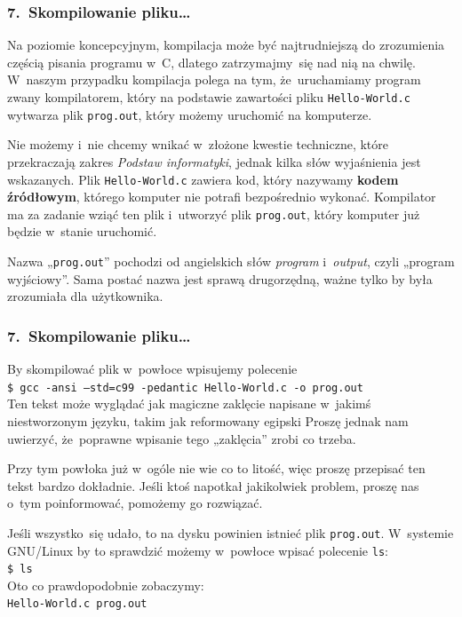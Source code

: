 \documentclass[10pt,t]{beamer}
\begin{document}
\begin{frame}
  \frametitle{7.~Skompilowanie pliku\ldots}


  Na poziomie koncepcyjnym, kompilacja może być najtrudniejszą do
  zrozumienia częścią pisania programu w~C, dlatego zatrzymajmy~się nad
  nią na chwilę. W~naszym przypadku kompilacja polega na tym, że~uruchamiamy
  program zwany kompilatorem, który na podstawie zawartości pliku
  \texttt{Hello-World.c} wytwarza plik \texttt{prog.out}, który możemy
  uruchomić na komputerze.

  Nie możemy i~nie chcemy wnikać w~złożone kwestie techniczne, które
  przekraczają zakres \textit{Podstaw informatyki}, jednak kilka słów
  wyjaśnienia jest wskazanych. Plik \texttt{Hello-World.c} zawiera kod,
  który nazywamy \textbf{kodem źródłowym}, którego komputer nie potrafi
  bezpośrednio wykonać. Kompilator ma za zadanie wziąć ten plik i~utworzyć
  plik \texttt{prog.out}, który komputer już będzie w~stanie uruchomić.

  Nazwa „\texttt{prog.out}” pochodzi od angielskich słów \textit{program}
  i~\textit{output}, czyli „program wyjściowy”. Sama postać nazwa jest
  sprawą drugorzędną, ważne tylko by była zrozumiała dla użytkownika.

\end{frame}




\begin{frame}
  \frametitle{7.~Skompilowanie pliku\ldots}


  By skompilować plik w~powłoce wpisujemy polecenie \\
  \texttt{\$ gcc -ansi --std=c99 -pedantic Hello-World.c -o
    prog.out} \\
  Ten tekst może wyglądać jak magiczne zaklęcie napisane w~jakimś
  niestworzonym języku, takim jak reformowany egipski
   Proszę jednak nam uwierzyć, że~poprawne wpisanie tego
  „zaklęcia” zrobi co trzeba.

  Przy tym powłoka już w~ogóle nie wie co to litość, więc proszę przepisać
  ten tekst bardzo dokładnie. Jeśli ktoś napotkał jakikolwiek problem,
  proszę nas o~tym poinformować, pomożemy go rozwiązać.

  Jeśli wszystko~się udało, to na dysku powinien istnieć plik
  \texttt{prog.out}. W~systemie GNU/Linux by to sprawdzić możemy w~powłoce
  wpisać polecenie \texttt{ls}: \\
  \texttt{\$ ls} \\
  Oto co prawdopodobnie zobaczymy: \\
  \texttt{Hello-World.c \quad prog.out} \\

\end{frame}
\end{document}
